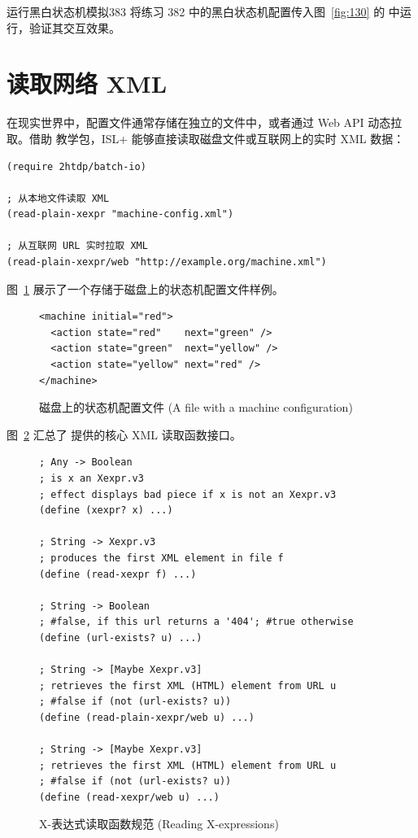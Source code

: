\begin{exercise}{运行黑白状态机模拟}{383}
将练习 382 中的黑白状态机配置传入图~\ref{fig:130} 的  中运行，验证其交互效果。
\end{exercise}

\section{读取网络 XML }
\label{sec:22.4_reading_xml}

在现实世界中，配置文件通常存储在独立的文件中，或者通过 Web API 动态拉取。借助  教学包，ISL+ 能够直接读取磁盘文件或互联网上的实时 XML 数据：

\begin{lstlisting}[language=BSL]
(require 2htdp/batch-io)

; 从本地文件读取 XML
(read-plain-xexpr "machine-config.xml")

; 从互联网 URL 实时拉取 XML
(read-plain-xexpr/web "http://example.org/machine.xml")
\end{lstlisting}

图~\ref{fig:131} 展示了一个存储于磁盘上的状态机配置文件样例。

\begin{figure}[htbp]
  \centering
\begin{stepperbox}[unbreakable, title={machine-configuration.xml}, fonttitle=\footnotesize\ttfamily\bfseries, colbacktitle=CodeFrame!60!white, coltitle=NavyTheme]
\begin{Verbatim}[fontsize=\footnotesize]
<machine initial="red">
  <action state="red"    next="green" />
  <action state="green"  next="yellow" />
  <action state="yellow" next="red" />
</machine>
\end{Verbatim}
\end{stepperbox}
  \caption{磁盘上的状态机配置文件 (A file with a machine configuration)}
  \label{fig:131}
\end{figure}

图~\ref{fig:132} 汇总了  提供的核心 XML 读取函数接口。

\begin{figure}[htbp]
  \centering
\begin{lstlisting}[language=BSL, basicstyle=\scriptsize\ttfamily]
; Any -> Boolean
; is x an Xexpr.v3
; effect displays bad piece if x is not an Xexpr.v3
(define (xexpr? x) ...)

; String -> Xexpr.v3
; produces the first XML element in file f
(define (read-xexpr f) ...)

; String -> Boolean
; #false, if this url returns a '404'; #true otherwise
(define (url-exists? u) ...)

; String -> [Maybe Xexpr.v3]
; retrieves the first XML (HTML) element from URL u
; #false if (not (url-exists? u))
(define (read-plain-xexpr/web u) ...)

; String -> [Maybe Xexpr.v3]
; retrieves the first XML (HTML) element from URL u
; #false if (not (url-exists? u))
(define (read-xexpr/web u) ...)
\end{lstlisting}
  \caption{X-表达式读取函数规范 (Reading X-expressions)}
  \label{fig:132}
\end{figure}

